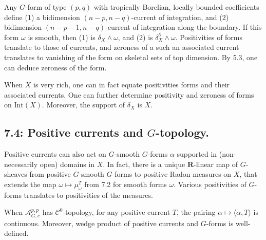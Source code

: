 \documentclass[12pt,reqno]{amsart}
\theoremstyle{definition}
\theoremstyle{remark}
\theoremstyle{citedrem}
\theoremstyle{cited}
\theoremstyle{citeddef}
\theoremstyle{step}
\begin{document}
Any $G$-form of type $(p,q)$ with tropically Borelian, locally bounded coefficients define (1) a bidimension $(n-p,n-q)$-current of integration, and (2) bidimension $(n-p-1,n-q)$-current of integration along the boundary. If this form $\omega$ is smooth, then (1) is $\delta_X \wedge \omega$, and (2) is $\delta_X^\partial \wedge \omega$. Positivities of forms translate to those of currents, and zeroness of a such an associated current translates to vanishing of the form on skeletal sets of top dimension. By 5.3, one can deduce zeroness of the form. 

When $X$ is very rich, one can in fact equate positivities forms and their associated currents. One can further determine positivity and zeroness of forms on $\mathrm{Int}(X)$. Moreover, the support of $\delta_X$ is $X$. 

\subsection*{7.4: Positive currents and $G$-topology. }Positive currents can also act on $G$-smooth $G$-forms $\alpha$ supported in (non-necessarily open) domains in $X$. In fact, there is a unique $\mathbf{R}$-linear map of $G$-sheaves from positive $G$-smooth $G$-forms to positive Radon measures on $X$, that extends the map $\omega \mapsto \mu^T_\omega$ from 7.2 for smooth forms $\omega$. Various positivities of $G$-forms translates to positivities of the measures. 

When $\mathcal{A}_{G,c}^{p,p}$ has $\mathcal{C}^0$-topology, for any positive current $T$, the pairing $\alpha \mapsto \langle \alpha, T\rangle $ is continuous. Moreover, wedge product of positive currents and $G$-forms is well-defined. 
\end{document}
